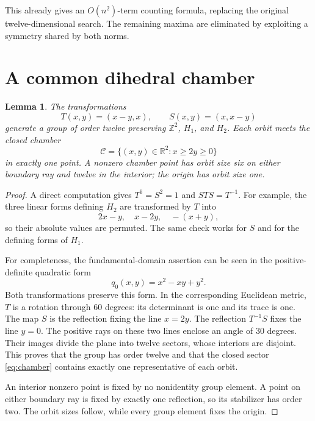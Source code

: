 \documentclass[11pt]{article}
\numberwithin{equation}{section}
\newtheorem{lemma}[theorem]{Lemma}
\theoremstyle{definition}
\newcommand{\Z}{\mathbb Z}
\newcommand{\R}{\mathbb R}
\begin{document}
This already gives an $O(n^2)$-term counting formula, replacing the original
twelve-dimensional search. The remaining maxima are eliminated by exploiting
a symmetry shared by both norms.

\section{A common dihedral chamber}
\label{sec:chamber}

\begin{lemma}\label{lem:dihedral}
The transformations
\begin{equation}\label{eq:TS}
 T(x,y)=(x-y,x),\qquad S(x,y)=(x,x-y)
\end{equation}
generate a group of order twelve preserving $\Z^2$, $H_1$, and $H_2$.
Each orbit meets the closed chamber
\begin{equation}\label{eq:chamber}
\mathcal C=\{(x,y)\in\R^2:x\geq2y\geq0\}
\end{equation}
in exactly one point. A nonzero chamber point has orbit size six on either
boundary ray and twelve in the interior; the origin has orbit size one.
\end{lemma}

\begin{proof}
A direct computation gives $T^6=S^2=1$ and $STS=T^{-1}$.
For example, the three linear forms defining $H_2$ are transformed by $T$
into
\[
 2x-y,\quad x-2y,\quad -(x+y),
\]
so their absolute values are permuted. The same check works for $S$ and for
the defining forms of $H_1$.

For completeness, the fundamental-domain assertion can be seen in the
positive-definite quadratic form
\[
 q_0(x,y)=x^2-xy+y^2.
\]
Both transformations preserve this form. In the corresponding Euclidean
metric, $T$ is a rotation through $60$ degrees: its determinant is one and
its trace is one. The map $S$ is the reflection fixing the line $x=2y$.
The reflection $T^{-1}S$ fixes the line $y=0$. The positive rays on these two
lines enclose an angle of $30$ degrees. Their images divide the plane into
twelve sectors, whose interiors are disjoint. This proves that the group has
order twelve and that the closed sector \eqref{eq:chamber} contains exactly
one representative of each orbit.

An interior nonzero point is fixed by no nonidentity group element. A point
on either boundary ray is fixed by exactly one reflection, so its stabilizer
has order two. The orbit sizes follow, while every group element fixes the
origin.
\end{proof}
\end{document}
